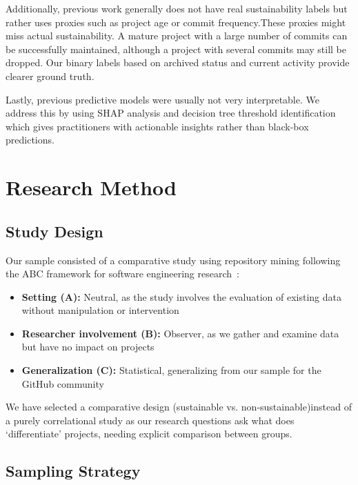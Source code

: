\documentclass[conference]{IEEEtran}
\begin{document}
Additionally, previous work generally does not have real sustainability labels but rather uses proxies such as project age or commit frequency.These proxies might miss actual sustainability. A mature project with a large number of commits can be successfully maintained, although a project with several commits may still be dropped. Our binary labels based on archived status and current activity provide clearer ground truth.

Lastly, previous predictive models were usually not very interpretable. We address this by using SHAP analysis and decision tree threshold identification which gives practitioners with actionable insights rather than black-box predictions.

\section{Research Method}

\subsection{Study Design}

Our sample consisted of a comparative study using repository mining following the ABC framework for software engineering research~\cite{stol2018}:

\begin{itemize}
    \item \textbf{Setting (A):} Neutral, as the study involves the evaluation of existing data without manipulation or intervention
    \item \textbf{Researcher involvement (B):} Observer, as we gather and examine data but have no impact on projects
    \item \textbf{Generalization (C):} Statistical, generalizing from our sample for the GitHub community
\end{itemize}

We have selected a comparative design (sustainable vs. non-sustainable)instead of a purely correlational study as our research questions ask what does ‘differentiate’ projects, needing explicit comparison between groups.

\subsection{Sampling Strategy}
\end{document}
